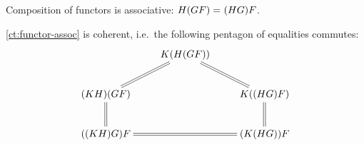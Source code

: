 \documentclass[hott-all.tex]{subfiles}
\begin{document}

\begin{lem}\label{ct:functor-assoc}
  Composition of functors is associative: $H(GF) =_{} (HG)F$.
\end{lem}
%

\begin{lem}\label{ct:pentagon}
  \cref{ct:functor-assoc} is coherent, i.e.\ the following pentagon of equalities commutes:
  \[ \xymatrix{ & K(H(GF)) \ar@{=}[dl] \ar@{=}[dr]\\
    (KH)(GF) \ar@{=}[d] && K((HG)F) \ar@{=}[d]\\
    ((KH)G)F && (K(HG))F \ar@{=}[ll] }
  \]
\end{lem}

\end{document}
